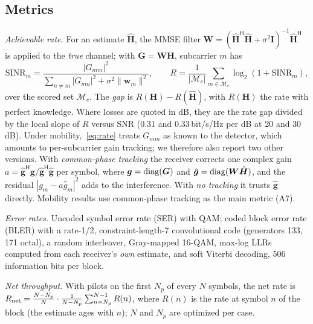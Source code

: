 \subsection{Metrics}
\emph{Achievable rate.} For an estimate $\hat{\bm H}$, the MMSE filter
$\bm W=(\hat{\bm H}^{\mathsf H}\hat{\bm H}+\sigma^2\bm I)^{-1}\hat{\bm H}^{\mathsf H}$ is applied to the
\emph{true} channel; with $\bm G=\bm W\bm H$, subcarrier $m$ has
\begin{equation}
\mathrm{SINR}_m=\frac{|G_{mm}|^2}{\sum_{n\ne m}|G_{mn}|^2+\sigma^2\|\bm w_m\|^2},\qquad
R=\frac{1}{|\mathcal M_c|}\sum_{m\in\mathcal M_c}\log_2(1+\mathrm{SINR}_m),
\label{eq:rate}
\end{equation}
over the scored set $\mathcal M_c$. The \emph{gap} is $R(\bm H)-R(\hat{\bm H})$, with $R(\bm H)$
the rate with perfect knowledge. Where losses are quoted in dB, they are the rate gap divided
by the local slope of $R$ versus SNR (0.31 and 0.33\,bit/s/Hz per dB at 20 and 30\,dB).
Under mobility,~\eqref{eq:rate} treats $G_{mm}$ as known to the detector, which amounts to
per-subcarrier gain tracking; we therefore also report two other versions. With
\emph{common-phase tracking} the receiver corrects one complex gain
$a=\hat{\bm g}^{\mathsf H}\bm g/\hat{\bm g}^{\mathsf H}\hat{\bm g}$ per symbol, where $\bm g=\operatorname{diag}(\bm G)$ and
$\hat{\bm g}=\operatorname{diag}(\bm W\hat{\bm H})$, and the residual $|g_m-a\hat g_m|^2$ adds to the interference.
With \emph{no tracking} it trusts $\hat{\bm g}$ directly. Mobility results use common-phase
tracking as the main metric (A7).

\emph{Error rates.} Uncoded symbol error rate (SER) with QAM; coded block error rate (BLER)
with a rate-1/2, constraint-length-7 convolutional code (generators 133, 171 octal), a random
interleaver, Gray-mapped 16-QAM, max-log LLRs computed from each receiver's \emph{own} estimate,
and soft Viterbi decoding, 506 information bits per block.

\emph{Net throughput.} With pilots on the first $N_p$ of every $N$ symbols, the net rate is
$R_{\rm net}=\frac{N-N_p}{N}\cdot\frac{1}{N-N_p}\sum_{n=N_p}^{N-1}R(n)$, where $R(n)$ is the rate at
symbol $n$ of the block (the estimate ages with $n$); $N$ and $N_p$ are optimized per case.

